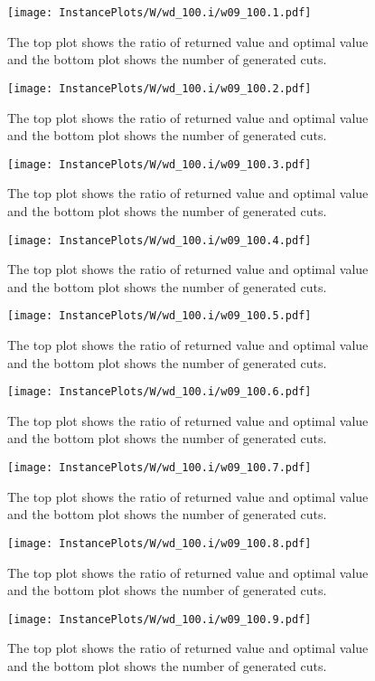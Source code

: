 \documentclass[10pt,a4paper]{article}
\begin{document}
\begin{figure}[H]
\texttt{[image: InstancePlots/W/wd\_100.i/w09\_100.1.pdf]}
\caption{The top plot shows the ratio of returned value and optimal value     and the bottom plot shows the number of generated cuts.}
\end{figure}

\begin{figure}[H]
\texttt{[image: InstancePlots/W/wd\_100.i/w09\_100.2.pdf]}
\caption{The top plot shows the ratio of returned value and optimal value     and the bottom plot shows the number of generated cuts.}
\end{figure}

\begin{figure}[H]
\texttt{[image: InstancePlots/W/wd\_100.i/w09\_100.3.pdf]}
\caption{The top plot shows the ratio of returned value and optimal value     and the bottom plot shows the number of generated cuts.}
\end{figure}

\begin{figure}[H]
\texttt{[image: InstancePlots/W/wd\_100.i/w09\_100.4.pdf]}
\caption{The top plot shows the ratio of returned value and optimal value     and the bottom plot shows the number of generated cuts.}
\end{figure}

\begin{figure}[H]
\texttt{[image: InstancePlots/W/wd\_100.i/w09\_100.5.pdf]}
\caption{The top plot shows the ratio of returned value and optimal value     and the bottom plot shows the number of generated cuts.}
\end{figure}

\begin{figure}[H]
\texttt{[image: InstancePlots/W/wd\_100.i/w09\_100.6.pdf]}
\caption{The top plot shows the ratio of returned value and optimal value     and the bottom plot shows the number of generated cuts.}
\end{figure}

\begin{figure}[H]
\texttt{[image: InstancePlots/W/wd\_100.i/w09\_100.7.pdf]}
\caption{The top plot shows the ratio of returned value and optimal value     and the bottom plot shows the number of generated cuts.}
\end{figure}

\begin{figure}[H]
\texttt{[image: InstancePlots/W/wd\_100.i/w09\_100.8.pdf]}
\caption{The top plot shows the ratio of returned value and optimal value     and the bottom plot shows the number of generated cuts.}
\end{figure}

\begin{figure}[H]
\texttt{[image: InstancePlots/W/wd\_100.i/w09\_100.9.pdf]}
\caption{The top plot shows the ratio of returned value and optimal value     and the bottom plot shows the number of generated cuts.}
\end{figure}
\end{document}
